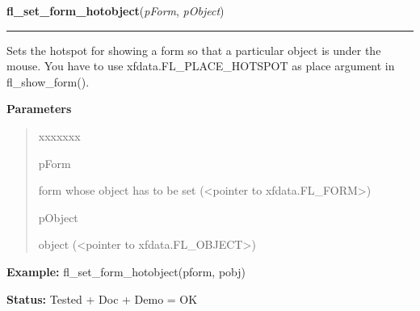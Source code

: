     \vspace{0.5ex}

\hspace{.8\funcindent}\begin{boxedminipage}{\funcwidth}

    \raggedright \textbf{fl\_set\_form\_hotobject}(\textit{pForm}, \textit{pObject})

    \vspace{-1.5ex}

    \rule{\textwidth}{0.5\fboxrule}
\setlength{\parskip}{2ex}
    Sets the hotspot for showing a form so that a particular object is 
    under the mouse. You have to use xfdata.FL\_PLACE\_HOTSPOT as place 
    argument in fl\_show\_form().

\setlength{\parskip}{1ex}
      \textbf{Parameters}
      \vspace{-1ex}

      \begin{quote}
        \begin{Ventry}{xxxxxxx}

          \item[pForm]

          form whose object has to be set ({\textless}pointer to 
          xfdata.FL\_FORM{\textgreater})

          \item[pObject]

          object ({\textless}pointer to xfdata.FL\_OBJECT{\textgreater})

        \end{Ventry}

      \end{quote}

\textbf{Example:} fl\_set\_form\_hotobject(pform, pobj)



\textbf{Status:} Tested + Doc + Demo = OK



    \end{boxedminipage}

    \label{xformslib:library:fl_set_form_minsize}

    \vspace{0.5ex}

